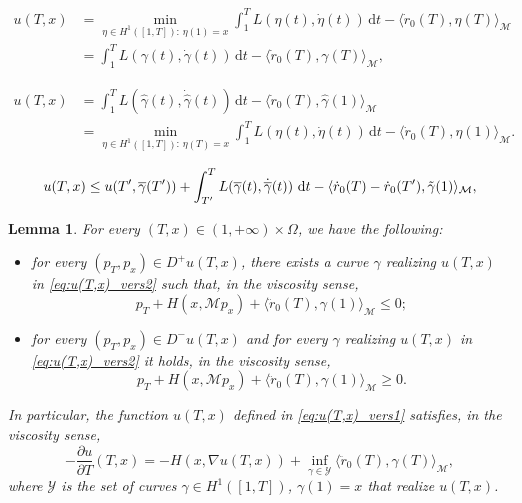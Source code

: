 \documentclass[10pt,a4paper]{amsart}
\newtheorem{lem}{Lemma}
\newcommand{\ud}{\mathrm{d}}
\begin{document}
\begin{equation}\label{eq:u(T,x)_vers1}
\begin{split}
u(T,x)&= \min_{\eta \in H^1([1,T]):\,\eta(1)=x}\int_1^T L(\eta(t),\dot \eta(t))\,\ud t - \langle \dot r_0(T), \eta(T)\rangle_\mathcal{M}
\\
&=\int_1^T L(\gamma(t),\dot{\gamma}(t))\,\ud t - \langle \dot r_0(T), \gamma(T)\rangle_\mathcal{M},
\end{split}
\end{equation}

\begin{equation}\label{eq:u(T,x)_vers2}
\begin{split}
u(T,x) &=\int_1^T L(\hat\gamma(t),\dot{\hat\gamma}(t))\, \ud t -\langle \dot r_0(T), \hat\gamma(1)\rangle_\mathcal{M}
\\
&= \min_{\eta \in H^1([1,T]):\, \eta(T)=x}\int_1^T L(\eta(t),\dot\eta(t))\, \ud t -
\langle \dot r_0(T), \eta(1)\rangle_\mathcal{M}.
\end{split}
\end{equation}

    \begin{equation}\label{eq:dpp}
        u(T,x) \leq u(T',\overline{\gamma}(T')) + \int_{T'}^{T} L(\overline{\gamma}(t),\dot{\overline{\gamma}}(t))\ \ud t - \langle\dot{r}_0(T)-\dot{r}_0(T'),\Tilde{\gamma}(1)\rangle_\mathcal{M},
    \end{equation}

    \begin{lem}
    \label{lem:Eq_u_T}
    For every $(T,x)\in(1,+\infty)\times\Omega$, we have the following:
    \begin{itemize}
        \item for every $(p_T,p_x) \in D^+ u(T,x)$, there exists a curve $\gamma$ realizing $u(T,x)$ in \eqref{eq:u(T,x)_vers2} such that, in the viscosity sense,
        \[
        p_T+H(x,\mathcal M p_x)+\langle \ddot{r}_0(T), \gamma(1)\rangle_\mathcal{M} \le 0;        \]
        \item for every $(p_T,p_x) \in D^- u(T,x)$ and for every $\gamma$ realizing $u(T,x)$ in \eqref{eq:u(T,x)_vers2} it holds, in the viscosity sense,
        \[
        p_T + H(x, \mathcal M p_x) + \langle \ddot{r}_0(T),\gamma(1)\rangle_\mathcal{M} \geq 0.
        \]
    \end{itemize}

    In particular, the function
        $u(T,x)$ defined in \eqref{eq:u(T,x)_vers1} satisfies, in the viscosity sense,
        \begin{equation}
            \label{eq:Eq_u_T}
           -\frac{\partial u}{\partial T}(T,x)=-H(x,\nabla u(T,x)) + \inf_{\gamma \in \mathcal{Y}}\langle \ddot r_0(T),\gamma(T)\rangle_\mathcal{M},
         \end{equation}
        where $\mathcal Y$ is the set of curves $\gamma \in H^1([1,T])$, $\gamma(1)=x$ that realize $u(T,x)$.
    \end{lem}
\end{document}
